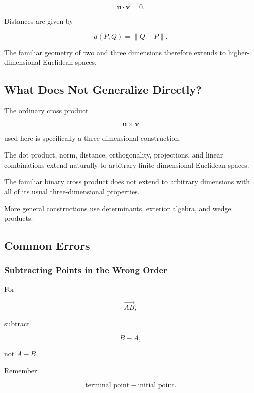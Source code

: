\[ \mathbf{u}\cdot\mathbf{v}=0. \]

Distances are given by

\[ d(P,Q)=\|Q-P\|. \]

The familiar geometry of two and three dimensions therefore extends to
higher-dimensional Euclidean spaces.

\subsection{What Does Not Generalize Directly?}
\label{subsec:cross-product-dimension-limit}

The ordinary cross product

\[ \mathbf{u}\times\mathbf{v} \]

used here is specifically a three-dimensional construction.

The dot product, norm, distance, orthogonality, projections, and linear
combinations extend naturally to arbitrary finite-dimensional Euclidean
spaces.

The familiar binary cross product does not extend to arbitrary dimensions
with all of its usual three-dimensional properties.

More general constructions use determinants, exterior algebra, and wedge
products.

\subsection{Common Errors}
\label{subsec:vector-geometry-common-errors}

\subsubsection{Subtracting Points in the Wrong Order}

For

\[ \overrightarrow{AB}, \]

subtract

\[ B-A, \]

not \(A-B\).

Remember:

\[
\boxed{
\text{terminal point}
-
\text{initial point}.
}
\]

